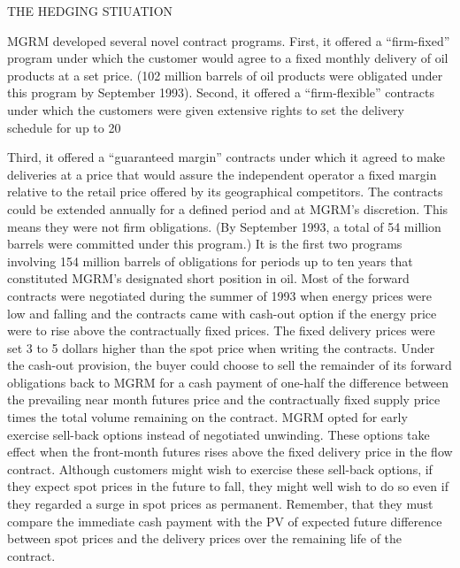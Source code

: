 THE HEDGING STIUATION

MGRM developed several novel contract programs.  First, it offered a “firm-fixed” program under which the customer would agree to a fixed monthly delivery of oil products at a set price.  (102 million barrels of oil products were obligated under this program by September 1993).  Second, it offered a “firm-flexible” contracts under which the customers were given
extensive rights to set the delivery schedule for up to 20%

Third, it offered a “guaranteed margin” contracts under which it agreed to make deliveries at a price that would assure the independent operator a fixed margin relative to the retail price offered by its geographical competitors.  The contracts could be extended annually for a defined period and at MGRM’s discretion.  This means they were not firm obligations.  (By September 1993, a total of 54 million barrels were committed under this program.)  It is the first two programs involving 154 million barrels of obligations for periods up to ten years that constituted MGRM’s designated short position in oil. Most of the forward contracts were negotiated during the summer of 1993 when energy prices were low and falling and the contracts came with cash-out option if the energy price were to rise above the contractually fixed prices.  The fixed delivery prices were set 3 to 5 dollars higher than the spot price when writing the contracts.  Under the cash-out provision, the buyer could choose to sell the remainder of its forward obligations back to MGRM for a cash payment of one-half the difference between the prevailing near month futures price and the contractually fixed supply price times the total volume remaining on the contract.  MGRM opted for early exercise sell-back options instead of negotiated unwinding. These options take effect when the front-month futures rises above the fixed delivery price in the flow contract.   Although customers might wish to exercise these sell-back options, if they expect spot prices in the future to fall, they might well wish to do so even if they regarded a surge in spot prices as permanent. Remember, that they must compare the immediate cash payment with the PV of expected future difference between spot prices and the delivery prices over the remaining life of the contract.

